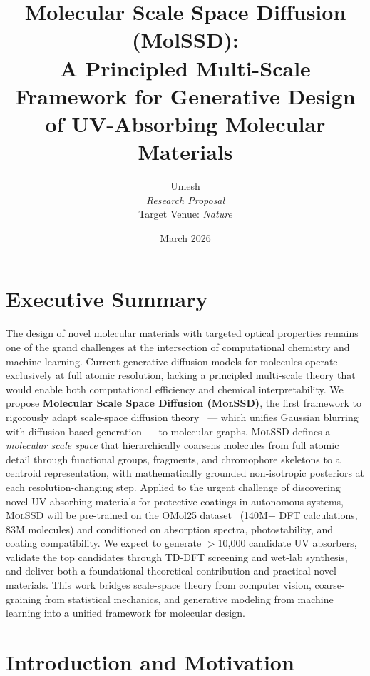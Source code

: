 \documentclass[11pt,a4paper]{article}
\title{%
  \vspace{-1cm}
  \textbf{Molecular Scale Space Diffusion (MolSSD):} \\[6pt]
  \large A Principled Multi-Scale Framework for Generative Design \\
  of UV-Absorbing Molecular Materials
}
\author{
  Umesh \\
  \textit{Research Proposal} \\[4pt]
  \small Target Venue: \textit{Nature}
}
\date{March 2026}
\newcommand{\molssd}{\textsc{MolSSD}}
\begin{document}
\maketitle
\thispagestyle{empty}

\section{Executive Summary}

The design of novel molecular materials with targeted optical properties remains one of the
grand challenges at the intersection of computational chemistry and machine learning.
Current generative diffusion models for molecules operate exclusively at full atomic
resolution, lacking a principled multi-scale theory that would enable both computational
efficiency and chemical interpretability. We propose \textbf{Molecular Scale Space Diffusion
(\molssd{})}, the first framework to rigorously adapt scale-space diffusion
theory~\citep{ssd2026} --- which unifies Gaussian blurring with diffusion-based generation
--- to molecular graphs. \molssd{} defines a \emph{molecular scale space} that
hierarchically coarsens molecules from full atomic detail through functional groups,
fragments, and chromophore skeletons to a centroid representation, with mathematically
grounded non-isotropic posteriors at each resolution-changing step. Applied to the urgent
challenge of discovering novel UV-absorbing materials for protective coatings in autonomous
systems, \molssd{} will be pre-trained on the OMol25 dataset~\citep{omol25} (140M+ DFT
calculations, 83M molecules) and conditioned on absorption spectra, photostability, and
coating compatibility. We expect to generate $>$10,000 candidate UV absorbers, validate the
top candidates through TD-DFT screening and wet-lab synthesis, and deliver both a
foundational theoretical contribution and practical novel materials. This work bridges
scale-space theory from computer vision, coarse-graining from statistical mechanics, and
generative modeling from machine learning into a unified framework for molecular design.


\section{Introduction and Motivation}
\end{document}
